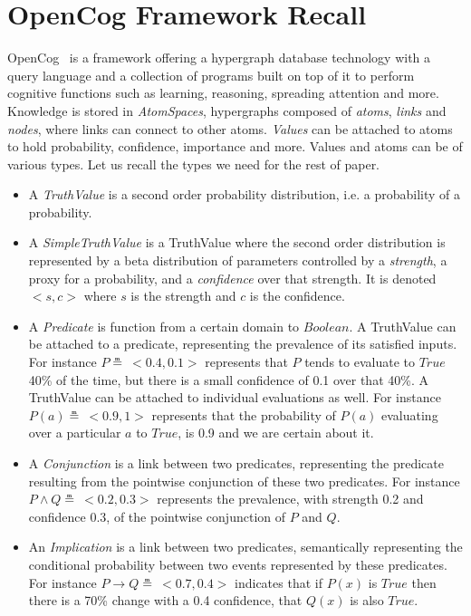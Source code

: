 \documentclass[runningheads]{llncs}
\newcommand{\TTrue}{\textit{True}}
\newcommand{\limp}{\rightarrow}
\begin{document}

\section{OpenCog Framework Recall}
\label{sec:opencog}
OpenCog~\cite{Hart2008} is a framework offering a hypergraph database
technology with a query language and a collection of programs built on
top of it to perform cognitive functions such as learning, reasoning,
spreading attention and more.  Knowledge is stored in
\emph{AtomSpaces}, hypergraphs composed of \emph{atoms}, \emph{links}
and \emph{nodes}, where links can connect to other atoms.
\emph{Values} can be attached to atoms to hold probability,
confidence, importance and more.  Values and atoms can be of various
types.  Let us recall the types we need for the rest of paper.
\begin{itemize}
\item A \emph{TruthValue} is a second order probability distribution,
  i.e. a probability of a probability.
\item A \emph{SimpleTruthValue} is a TruthValue where the second order
  distribution is represented by a beta distribution of parameters
  controlled by a \emph{strength}, a proxy for a probability, and a
  \emph{confidence} over that strength.  It is denoted $<\!s, c\!>$ where
  $s$ is the strength and $c$ is the confidence.
\item A \emph{Predicate} is function from a certain domain to
  $Boolean$.  A TruthValue can be attached to a predicate,
  representing the prevalence of its satisfied inputs.  For instance
  $P \measeq\ <\!0.4, 0.1\!>$ represents that $P$ tends to evaluate to
  $\TTrue$ 40\% of the time, but there is a small confidence of 0.1
  over that 40\%.  A TruthValue can be attached to individual
  evaluations as well.  For instance $P(a) \measeq\ <\!0.9, 1\!>$
  represents that the probability of $P(a)$ evaluating over a
  particular $a$ to $\TTrue$, is 0.9 and we are certain about it.
\item A \emph{Conjunction} is a link between two predicates,
  representing the predicate resulting from the pointwise conjunction
  of these two predicates.  For instance
  $P \land Q \measeq\ <\!0.2, 0.3\!>$ represents the prevalence, with
  strength 0.2 and confidence 0.3, of the pointwise conjunction of $P$
  and $Q$.
\item An \emph{Implication} is a link between two predicates,
  semantically representing the conditional probability between two
  events represented by these predicates.  For instance
  $P \limp Q \measeq\ <\!0.7, 0.4\!>$ indicates that if $P(x)$ is
  $\TTrue$ then there is a 70\% change with a 0.4 confidence,
  that $Q(x)$ is also $\TTrue$.
\end{itemize}
\end{document}
